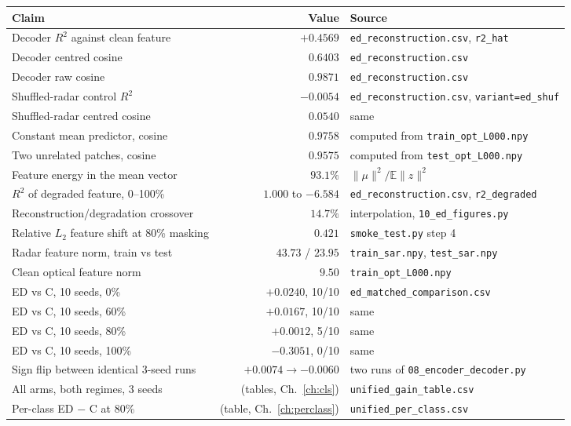 \documentclass[11pt,a4paper]{report}
\newcommand{\file}[1]{\texttt{\small #1}}
\newcommand{\code}[1]{\texttt{\small #1}}
\begin{document}
\begin{center}
\scriptsize
\begin{longtable}{@{}p{6.9cm}rp{5.6cm}@{}}
\toprule
\textbf{Claim} & \textbf{Value} & \textbf{Source} \\
\midrule
\endhead
Decoder $R^2$ against clean feature & $+0.4569$ & \file{ed\_reconstruction.csv}, \code{r2\_hat} \\
Decoder centred cosine & $0.6403$ & \file{ed\_reconstruction.csv} \\
Decoder raw cosine & $0.9871$ & \file{ed\_reconstruction.csv} \\
Shuffled-radar control $R^2$ & $-0.0054$ & \file{ed\_reconstruction.csv}, \code{variant=ed\_shuf} \\
Shuffled-radar centred cosine & $0.0540$ & same \\
Constant mean predictor, cosine & $0.9758$ & computed from \file{train\_opt\_L000.npy} \\
Two unrelated patches, cosine & $0.9575$ & computed from \file{test\_opt\_L000.npy} \\
Feature energy in the mean vector & $93.1\%$ & $\|\mu\|^2 / \mathbb{E}\|z\|^2$ \\
$R^2$ of degraded feature, 0--100\% & $1.000$ to $-6.584$ & \file{ed\_reconstruction.csv}, \code{r2\_degraded} \\
Reconstruction/degradation crossover & $14.7\%$ & interpolation, \file{10\_ed\_figures.py} \\
Relative $L_2$ feature shift at 80\% masking & $0.421$ & \file{smoke\_test.py} step 4 \\
Radar feature norm, train vs test & $43.73$ / $23.95$ & \file{train\_sar.npy}, \file{test\_sar.npy} \\
Clean optical feature norm & $9.50$ & \file{train\_opt\_L000.npy} \\
ED vs C, 10 seeds, 0\% & $+0.0240$, 10/10 & \file{ed\_matched\_comparison.csv} \\
ED vs C, 10 seeds, 60\% & $+0.0167$, 10/10 & same \\
ED vs C, 10 seeds, 80\% & $+0.0012$, 5/10 & same \\
ED vs C, 10 seeds, 100\% & $-0.3051$, 0/10 & same \\
Sign flip between identical 3-seed runs & $+0.0074 \to -0.0060$ & two runs of \file{08\_encoder\_decoder.py} \\
All arms, both regimes, 3 seeds & (tables, Ch.\ \ref{ch:cls}) & \file{unified\_gain\_table.csv} \\
Per-class ED $-$ C at 80\% & (table, Ch.\ \ref{ch:perclass}) & \file{unified\_per\_class.csv} \\

\end{longtable}
\end{center}
\end{document}
